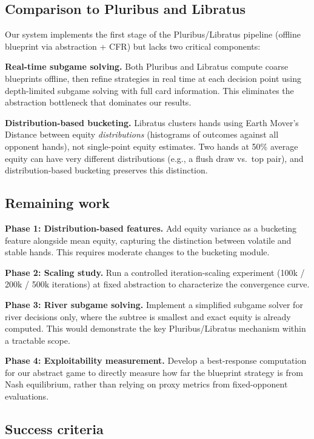 \documentclass{article}
\begin{document}
\subsection{Comparison to Pluribus and Libratus}

Our system implements the first stage of the Pluribus/Libratus pipeline (offline blueprint via abstraction + CFR) but lacks two critical components:

\textbf{Real-time subgame solving.} Both Pluribus and Libratus compute coarse blueprints offline, then refine strategies in real time at each decision point using depth-limited subgame solving with full card information. This eliminates the abstraction bottleneck that dominates our results.

\textbf{Distribution-based bucketing.} Libratus clusters hands using Earth Mover's Distance between equity \textit{distributions} (histograms of outcomes against all opponent hands), not single-point equity estimates. Two hands at 50\% average equity can have very different distributions (e.g., a flush draw vs.\ top pair), and distribution-based bucketing preserves this distinction.

\subsection{Remaining work}

\textbf{Phase 1: Distribution-based features.} Add equity variance as a bucketing feature alongside mean equity, capturing the distinction between volatile and stable hands. This requires moderate changes to the bucketing module.

\textbf{Phase 2: Scaling study.} Run a controlled iteration-scaling experiment (100k / 200k / 500k iterations) at fixed abstraction to characterize the convergence curve.

\textbf{Phase 3: River subgame solving.} Implement a simplified subgame solver for river decisions only, where the subtree is smallest and exact equity is already computed. This would demonstrate the key Pluribus/Libratus mechanism within a tractable scope.

\textbf{Phase 4: Exploitability measurement.} Develop a best-response computation for our abstract game to directly measure how far the blueprint strategy is from Nash equilibrium, rather than relying on proxy metrics from fixed-opponent evaluations.

\subsection{Success criteria}
\end{document}
